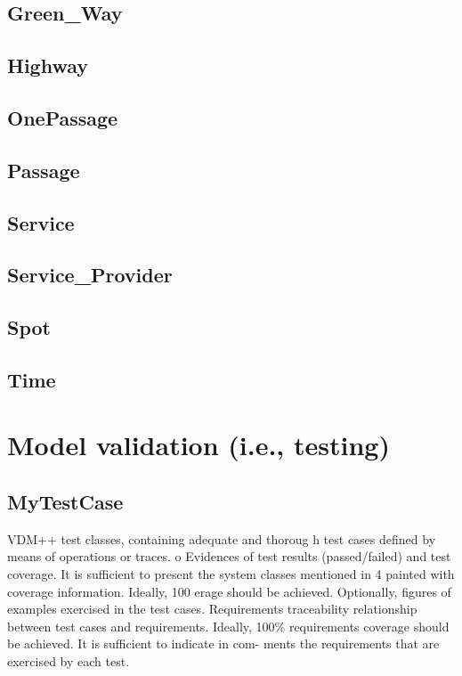 \documentclass[a4paper]{article}
\begin{document}
\subsection{Green\_Way}

\subsection{Highway}

\subsection{OnePassage}

\subsection{Passage}

\subsection{Service}

\subsection{Service\_Provider}

\subsection{Spot}

\subsection{Time}

\section{Model validation (i.e., testing)}
\subsection{MyTestCase}


VDM++ test classes, containing adequate and thoroug
h test cases defined by means of 
operations or traces.  
o
Evidences of test results (passed/failed) and test 
coverage. It is sufficient to present the 
system classes mentioned in 4 painted with coverage
 information. Ideally, 100%
erage should be achieved. 
Optionally, figures of examples exercised in the test cases. 
Requirements  traceability  relationship  between  test  cases  and requirements.  Ideally, 100\%  requirements  coverage  should  be  achieved.  It  is  sufficient  to  indicate  in  com-
ments the requirements that are exercised by each test. 
\end{document}
